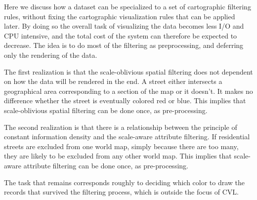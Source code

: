 Here we discuss how a dataset can be specialized to a set of cartographic filtering rules, without fixing the cartographic visualization rules that can be applied later. By doing so the overall task of visualizing the data becomes less I/O and CPU intensive, and the total cost of the system can therefore be expected to decrease. The idea is to do most of the filtering as preprocessing, and deferring only the rendering of the data.

The first realization is that the scale-oblivious spatial filtering does not dependent on how the data will be rendered in the end. A street either intersects a geographical area corresponding to a section of the map or it doesn't. It makes no difference whether the street is eventually colored red or blue. This implies that scale-oblivious spatial filtering can be done once, as pre-processing.

The second realization is that there is a relationship between the principle of constant information density and the scale-aware attribute filtering. If residential streets are excluded from one world map, simply because there are too many, they are likely to be excluded from any other world map. This implies that scale-aware attribute filtering can be done once, as pre-processing.

The task that remains corresponds roughly to deciding which color to draw the records that survived the filtering process, which is outside the focus of CVL.


